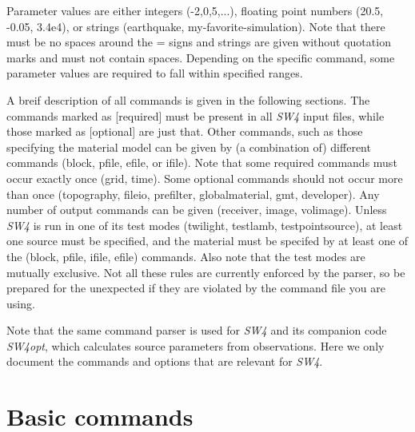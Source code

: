 \documentclass[11pt]{report}
\begin{document}
Parameter values are either integers (-2,0,5,...), floating point numbers (20.5, -0.05, 3.4e4), or strings
(earthquake, my-favorite-simulation). Note that there must be no spaces around the = signs and
strings are given without quotation marks and must not contain spaces. Depending on the specific
command, some parameter values are required to fall within specified ranges.

A breif description of all commands is given in the following sections. The commands marked as
[required] must be present in all \emph{SW4} input files, while those marked as [optional] are just
that. Other commands, such as those specifying the material model can be given by (a combination of)
different commands (block, pfile, efile, or ifile). Note that some required commands must occur
exactly once (grid, time). Some optional commands should not occur more than once (topography,
fileio, prefilter, globalmaterial, gmt, developer). Any number of output commands can
be given (receiver, image, volimage). Unless \emph{SW4} is run in one of its test modes (twilight,
testlamb, testpointsource), at least one source must be specified, and the material must be specifed
by at least one of the (block, pfile, ifile, efile) commands. Also note that the test modes are
mutually exclusive. Not all these rules are currently enforced by the parser, so be prepared for the
unexpected if they are violated by the command file you are using.

Note that the same command parser is used for \emph{SW4} and its companion code \emph{SW4opt}, which
calculates source parameters from observations. Here we only document the commands and options
that are relevant for \emph{SW4}.

\section{Basic commands}
\end{document}
